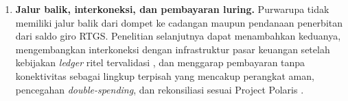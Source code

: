 \begin{enumerate}
    \item \textbf{Jalur balik, interkoneksi, dan pembayaran luring.} Purwarupa tidak memiliki jalur balik dari dompet ke cadangan maupun pendanaan penerbitan dari saldo giro RTGS. Penelitian selanjutnya dapat menambahkan keduanya, mengembangkan interkoneksi dengan infrastruktur pasar keuangan setelah kebijakan \textit{ledger} ritel tervalidasi \cite{bi_whitepaper2022}, dan menggarap pembayaran tanpa konektivitas sebagai lingkup terpisah yang mencakup perangkat aman, pencegahan \textit{double-spending}, dan rekonsiliasi sesuai Project Polaris \cite{polaris_security, polaris_handbook}.
\end{enumerate}
